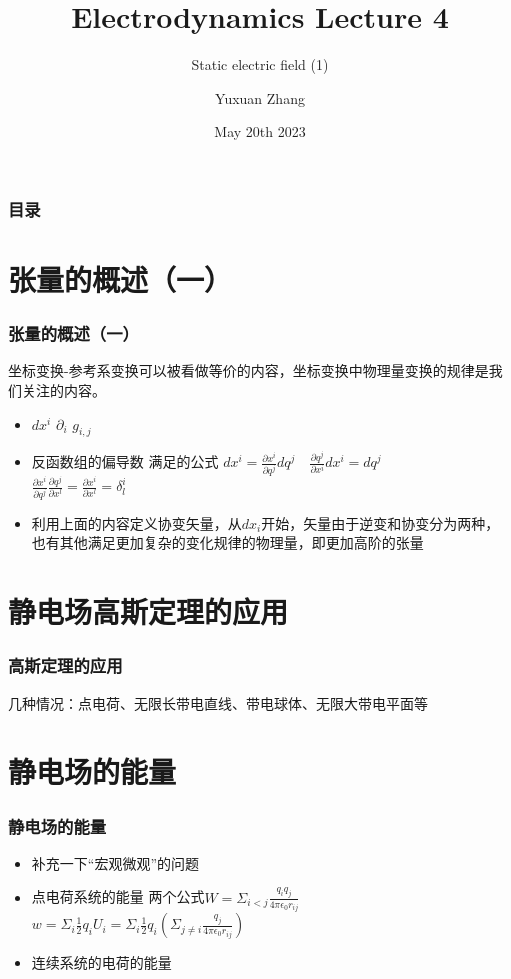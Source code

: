 \documentclass[10pt]{beamer}
\title[About Beamer] %
{Electrodynamics Lecture 4}
\subtitle{Static electric field (1) }
\author %
{Yuxuan Zhang }
\institute[VFU] %
{
  School of Physics \quad
  Zhejiang University
}
\date[VLC 2021] %
{May 20th 2023}
\begin{document}
\frame{\titlepage}

\begin{frame}
    \frametitle{目录}
    \tableofcontents
\end{frame}

\section{张量的概述（一）}
\begin{frame}
    \frametitle{张量的概述（一）}
    坐标变换-参考系变换可以被看做等价的内容，坐标变换中物理量变换的规律是我们关注的内容。
    \begin{itemize}
        \item $dx^i$ \quad $\partial_i$ \quad  $g_{i,j}$
        \item 反函数组的偏导数 满足的公式 $dx^i = \frac{\partial x^i}{\partial q^j}dq^j \quad \frac{\partial q^j}{\partial x^i}dx^i = dq^j $
        \\ $\frac{\partial x^i}{\partial q^j} \frac{\partial q^j}{\partial x^l} =\frac{\partial x^i}{\partial x^l} =\delta^i_l$
        \item 利用上面的内容定义协变矢量，从$dx_i$开始，矢量由于逆变和协变分为两种，也有其他满足更加复杂的变化规律的物理量，即更加高阶的张量
    \end{itemize}
\end{frame}

\section{静电场高斯定理的应用}
\begin{frame}
    \frametitle{高斯定理的应用}
    几种情况：点电荷、无限长带电直线、带电球体、无限大带电平面等
\end{frame}

\section{静电场的能量}
\begin{frame}
    \frametitle{静电场的能量}
    \begin{itemize}

    \item 补充一下“宏观微观”的问题\\
    \item 点电荷系统的能量 两个公式$W = \Sigma_{i< j} \frac{q_iq_j} {4\pi \epsilon_0 r_{ij}} $ 
    $w = \Sigma_i \frac{1}{2} q_i U_i = \Sigma_{i} \frac{1}{2} q_i \left( \Sigma_{j\neq i} \frac{q_j}{4\pi \epsilon_0 r_{ij}} \right) $ 
    \item 连续系统的电荷的能量
    \end{itemize}
\end{frame}
\end{document}

